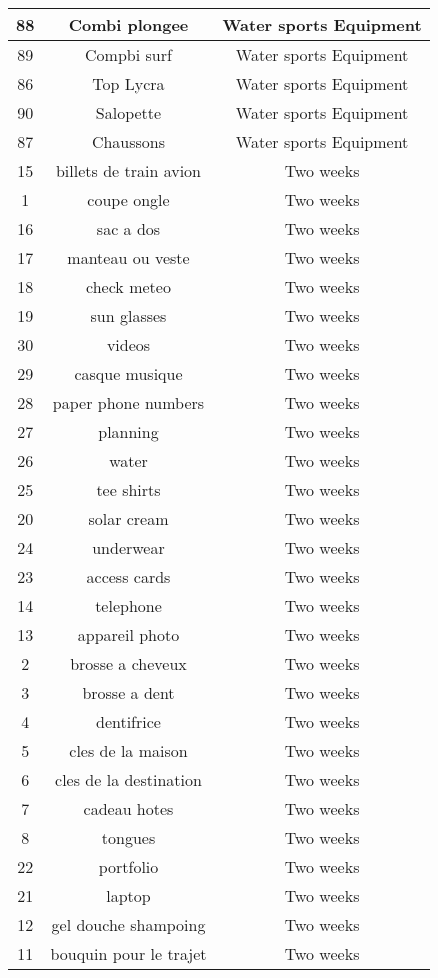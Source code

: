\begin{longtable}{|c|c|c|}
\hline
88 & Combi plongee & Water sports Equipment\\
\hline
89 & Compbi surf & Water sports Equipment\\
\hline
86 & Top Lycra & Water sports Equipment\\
\hline
90 & Salopette & Water sports Equipment\\
\hline
87 & Chaussons & Water sports Equipment\\
\hline
15 & billets de train avion & Two weeks\\
\hline
1 & coupe ongle & Two weeks\\
\hline
16 & sac a dos & Two weeks\\
\hline
17 & manteau ou veste  & Two weeks\\
\hline
18 & check meteo & Two weeks\\
\hline
19 & sun glasses & Two weeks\\
\hline
30 & videos & Two weeks\\
\hline
29 & casque musique & Two weeks\\
\hline
28 & paper phone numbers & Two weeks\\
\hline
27 & planning & Two weeks\\
\hline
26 & water & Two weeks\\
\hline
25 & tee shirts & Two weeks\\
\hline
20 & solar cream & Two weeks\\
\hline
24 & underwear & Two weeks\\
\hline
23 & access cards & Two weeks\\
\hline
14 & telephone & Two weeks\\
\hline
13 & appareil photo & Two weeks\\
\hline
2 & brosse a cheveux & Two weeks\\
\hline
3 & brosse a dent & Two weeks\\
\hline
4 & dentifrice & Two weeks\\
\hline
5 & cles de la maison & Two weeks\\
\hline
6 & cles de la destination & Two weeks\\
\hline
7 & cadeau hotes & Two weeks\\
\hline
8 & tongues & Two weeks\\
\hline
22 & portfolio & Two weeks\\
\hline
21 & laptop & Two weeks\\
\hline
12 & gel douche shampoing & Two weeks\\
\hline
11 & bouquin pour le trajet & Two weeks\\

\end{longtable}
